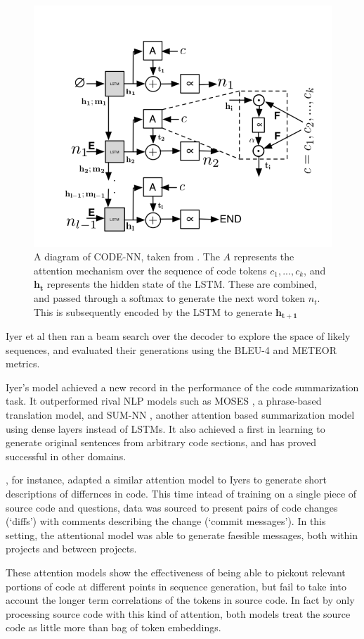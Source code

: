 \begin{figure}[tb]
    \centering
    \includegraphics[width=0.5\linewidth]{ModelPics/Iyer_etal.png}
    \caption{A diagram of CODE-NN, taken from \cite{iyer_summarizing_2016}. The $A$ represents the attention mechanism over the sequence of code tokens $c_1,..., c_k$, and $\mathbf{h_t}$ represents the hidden state of the LSTM. These are combined, and passed through a softmax to generate the next word token $n_t$. This is subsequently encoded by the LSTM to generate  $\mathbf{h_{t+1}}$}
    \label{fig:Iyer}
\end{figure}

Iyer et al then ran a beam search over the decoder to explore the space of likely sequences, and evaluated their generations using the BLEU-4 \citep{papineni_bleu_2001} and METEOR \citep{denkowski:lavie:meteor-wmt:2014} metrics.

Iyer's model achieved a new record in the performance of the code summarization task. 
It outperformed rival NLP models such as MOSES \citep{Koehn:2007:MOS:1557769.1557821}, a phrase-based translation model, and SUM-NN \citep{rush_neural_2015}, another attention based summarization model using dense layers instead of LSTMs. 
It also achieved a first in learning to generate original sentences from arbitrary code sections, and has proved successful in other domains.  

\citet{loyola_neural_2017}, for instance, adapted a similar attention model to Iyers to generate short descriptions of differnces in code.
This time intead of training on a single piece of source code and questions, data was sourced to present pairs of code changes (`diffs') with comments describing the change (`commit messages'). 
In this setting, the attentional model was able to generate faesible messages, both within projects and between projects.

These attention models show the effectiveness of being able to pickout relevant portions of code at different points in sequence generation, but fail to take into account the longer term correlations of the tokens in source code. In fact by only processing source code with this kind of attention, both models treat the source code as little more than bag of token embeddings.


